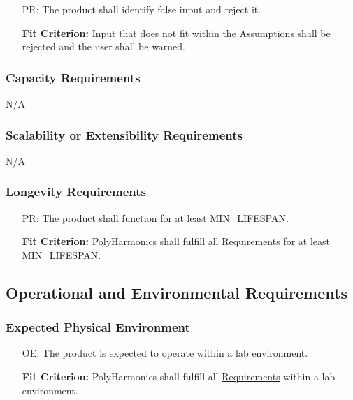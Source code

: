 \documentclass[12pt]{article}
\newcounter{perfnum}
\newcounter{oaenum}
\newcommand{\progname}{PolyHarmonics}
\begin{document}
\noindent \begin{itemize}
\item[PR\refstepcounter{perfnum}\theperfnum\label{NF_FT}:] The product shall
  identify false input and reject it.

  \textbf{Fit Criterion:} Input that does not fit within the
  \hyperref[Assumptions]{Assumptions} shall be rejected and the user shall 
  be warned.
\end{itemize}

\subsubsection{Capacity Requirements}

N/A

\subsubsection{Scalability or Extensibility Requirements}

N/A

\subsubsection{Longevity Requirements}

\noindent \begin{itemize} 
\item[PR\refstepcounter{perfnum}\theperfnum\label{NF_LG}:] The product shall
  function for at least \hyperref[AppendA]{MIN\_LIFESPAN}.

\textbf{Fit Criterion:} \progname{} shall fulfill all 
\hyperref[Func]{Requirements} for at least\\ \hyperref[AppendA]{MIN\_LIFESPAN}.
\end{itemize}

\subsection{Operational and Environmental Requirements}

\subsubsection{Expected Physical Environment}

\noindent \begin{itemize}
\item[OE\refstepcounter{oaenum}\theoaenum\label{NF_PE}:] The product is expected
  to operate within a lab environment.

  \textbf{Fit Criterion:} \progname{} shall fulfill all 
  \hyperref[Func]{Requirements} within a lab environment.


\end{itemize}
\end{document}
